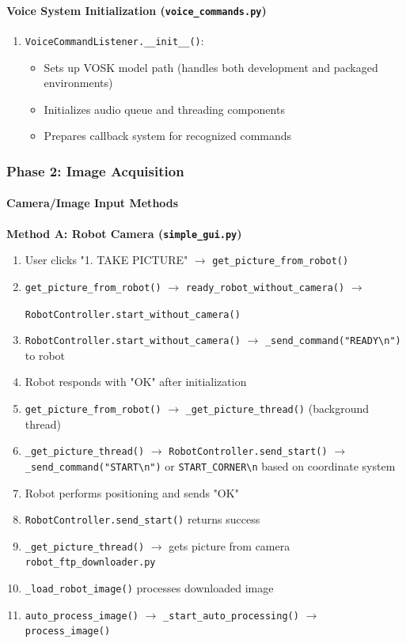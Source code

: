 \documentclass[a4paper,12pt]{article}
\begin{document}
\paragraph{Voice System Initialization (\texttt{voice\_commands.py})}
\begin{enumerate}
\item \texttt{VoiceCommandListener.\_\_init\_\_()}:
	\begin{itemize}
	\item Sets up VOSK model path (handles both development and packaged environments)
	\item Initializes audio queue and threading components
	\item Prepares callback system for recognized commands
	\end{itemize}
\end{enumerate}

\subsubsection{Phase 2: Image Acquisition}

\paragraph{Camera/Image Input Methods}

\textbf{Method A: Robot Camera (\texttt{simple\_gui.py})}
\begin{enumerate}
\item User clicks "1. TAKE PICTURE" $\rightarrow$ \texttt{get\_picture\_from\_robot()}
\item \texttt{get\_picture\_from\_robot()} $\rightarrow$ \texttt{ready\_robot\_without\_camera()} $\rightarrow$ 

\texttt{RobotController.start\_without\_camera()}
\item \texttt{RobotController.start\_without\_camera()} $\rightarrow$ \texttt{\_send\_command("READY\textbackslash n")} to robot
\item Robot responds with "OK" after initialization
\item \texttt{get\_picture\_from\_robot()} $\rightarrow$ \texttt{\_get\_picture\_thread()} (background thread)
\item \texttt{\_get\_picture\_thread()} $\rightarrow$ \texttt{RobotController.send\_start()} $\rightarrow$ \texttt{\_send\_command("START\textbackslash n")} or \texttt{START\_CORNER\textbackslash n} based on coordinate system
\item Robot performs positioning and sends "OK"
\item \texttt{RobotController.send\_start()} returns success
\item \texttt{\_get\_picture\_thread()} $\rightarrow$ gets picture from camera \texttt{robot\_ftp\_downloader.py}
\item \texttt{\_load\_robot\_image()} processes downloaded image
\item \texttt{auto\_process\_image()} $\rightarrow$ \texttt{\_start\_auto\_processing()} $\rightarrow$ \texttt{process\_image()}
\end{enumerate}
\end{document}
